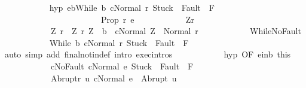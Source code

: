 \begin{isabellebody}
\ \ \ \ \ \ \ \ \ \ \isamarkupfalse%
\ hyp{\isacharcolon}\ {\isachardoublequoteopen}{\isasymlbrakk}e{\isasymin}b{\isacharsemicolon}{\isasymGamma}{\isasymturnstile}{\isasymlangle}While\ b\ c{\isacharcomma}Normal\ r{\isasymrangle}\ {\isasymRightarrow}{\isasymnotin}{\isacharparenleft}{\isacharbraceleft}Stuck{\isacharbraceright}\ {\isasymunion}\ Fault\ {\isacharbackquote}\ {\isacharparenleft}{\isacharminus}F{\isacharparenright}{\isacharparenright}{\isasymrbrakk}\isanewline
\ \ \ \ \ \ \ \ \ \ \ \ \ \ \ \ \ \ \ \ \ \ \ {\isasymLongrightarrow}\ {\isacharquery}Prop\ r\ e{\isachardoublequoteclose}\isanewline
\ \ \ \ \ \ \ \ \ \ \isamarkupfalse%
\ Z{\isacharunderscore}r{\isacharcolon}\isanewline
\ \ \ \ \ \ \ \ \ \ \ \ {\isachardoublequoteopen}{\isacharparenleft}Z{\isacharcomma}\ r{\isacharparenright}\ {\isasymin}\ {\isacharbraceleft}{\isacharparenleft}Z{\isacharcomma}\ r{\isacharparenright}{\isachardot}\ Z\ {\isasymin}\ b\ {\isasymand}\ {\isasymGamma}{\isasymturnstile}{\isasymlangle}c{\isacharcomma}Normal\ Z{\isasymrangle}\ {\isasymRightarrow}\ Normal\ r{\isacharbraceright}{\isachardoublequoteclose}\isanewline
\ \ \ \ \ \ \ \ \ \ \isamarkupfalse%
\ WhileNoFault\isanewline
\ \ \ \ \ \ \ \ \ \ \isamarkupfalse%
\ {\isachardoublequoteopen}{\isasymGamma}{\isasymturnstile}{\isasymlangle}While\ b\ c{\isacharcomma}Normal\ r{\isasymrangle}\ {\isasymRightarrow}{\isasymnotin}{\isacharparenleft}{\isacharbraceleft}Stuck{\isacharbraceright}\ {\isasymunion}\ Fault\ {\isacharbackquote}\ {\isacharparenleft}{\isacharminus}F{\isacharparenright}{\isacharparenright}{\isachardoublequoteclose}\isanewline
\ \ \ \ \ \ \ \ \ \ \ \ \isamarkupfalse%
\ {\isacharparenleft}auto\ simp\ add{\isacharcolon}\ final{\isacharunderscore}notin{\isacharunderscore}def\ intro{\isacharcolon}\ exec{\isachardot}intros{\isacharparenright}\isanewline
\ \ \ \ \ \ \ \ \ \ \isamarkupfalse%
\ hyp\ {\isacharbrackleft}OF\ e{\isacharunderscore}in{\isacharunderscore}b\ this{\isacharbrackright}\ \isamarkupfalse%
\isanewline
\ \ \ \ \ \ \ \ \ \ \ \ cNoFault{\isacharcolon}\ {\isachardoublequoteopen}{\isasymGamma}{\isasymturnstile}{\isasymlangle}c{\isacharcomma}Normal\ e{\isasymrangle}\ {\isasymRightarrow}{\isasymnotin}{\isacharparenleft}{\isacharbraceleft}Stuck{\isacharbraceright}\ {\isasymunion}\ Fault\ {\isacharbackquote}\ {\isacharparenleft}{\isacharminus}F{\isacharparenright}{\isacharparenright}{\isachardoublequoteclose}\ \isanewline
\ \ \ \ \ \ \ \ \ \ \ \ Abrupt{\isacharunderscore}r{\isacharcolon}\ {\isachardoublequoteopen}{\isasymforall}u{\isachardot}\ {\isasymGamma}{\isasymturnstile}{\isasymlangle}c{\isacharcomma}Normal\ e{\isasymrangle}\ {\isasymRightarrow}\ Abrupt\ u\ {\isasymlongrightarrow}\ \isanewline

\end{isabellebody}
